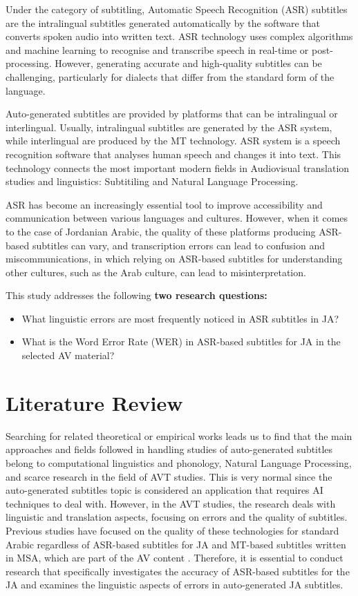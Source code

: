 \documentclass[english]{textolivre}
\begin{document}
Under the category of subtitling, Automatic Speech Recognition (ASR)
subtitles are the intralingual subtitles generated automatically by the
software that converts spoken audio into written text. ASR technology
uses complex algorithms and machine learning to recognise and transcribe
speech in real-time or post-processing. However, generating accurate and
high-quality subtitles can be challenging, particularly for dialects
that differ from the standard form of the language.

Auto-generated subtitles are provided by platforms that can be
intralingual or interlingual. Usually, intralingual subtitles are
generated by the ASR system, while interlingual are produced by the MT
technology. ASR system is a speech recognition software that analyses
human speech and changes it into text. This technology connects the most
important modern fields in Audiovisual translation studies and
linguistics: Subtitiling and Natural Language Processing.

ASR has become an increasingly essential tool to improve accessibility
and communication between various languages and cultures. However, when
it comes to the case of Jordanian Arabic, the quality of these platforms
producing ASR-based subtitles can vary, and transcription errors can
lead to confusion and miscommunications, in which relying on ASR-based
subtitles for understanding other cultures, such as the Arab culture,
can lead to misinterpretation.

This study addresses the following \textbf{two research questions:}

\begin{itemize}
\item What linguistic errors are most frequently noticed in ASR subtitles in JA?
\item What is the Word Error Rate (WER) in ASR-based subtitles for JA in the selected AV material?
\end{itemize}
	
\section{Literature Review}\label{literature-review}

Searching for related theoretical or empirical works leads us to find
that the main approaches and fields followed in handling studies of
auto-generated subtitles belong to computational linguistics and
phonology, Natural Language Processing, and scarce research in the field
of AVT studies. This is very normal since the auto-generated subtitles
topic is considered an application that requires AI techniques to deal
with. However, in the AVT studies, the research deals with linguistic
and translation aspects, focusing on errors and the quality of
subtitles. Previous studies have focused on the quality of these
technologies for standard Arabic regardless of ASR-based subtitles for
JA and MT-based subtitles written in MSA, which are part of the AV
content \cite{almahasees_machine_2017, bendou_automatic_2021}. Therefore, it is
essential to conduct research that specifically investigates the
accuracy of ASR-based subtitles for the JA and examines the linguistic
aspects of errors in auto-generated JA subtitles.
\end{document}
